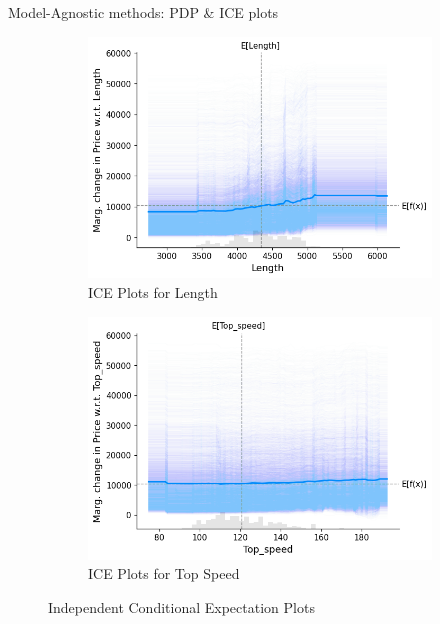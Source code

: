 \documentclass{beamer}
\begin{document}
\begin{frame}{Model-Agnostic methods: PDP \& ICE plots}
\begin{figure}[h]
    \begin{subfigure}{0.38\textwidth}
      \includegraphics[width=\linewidth]{ice_length.png}
      \caption{ICE Plots for Length}
      \label{ice_length}
    \end{subfigure}
    \hfill
    \begin{subfigure}{0.38\textwidth}
      \includegraphics[width=\linewidth]{ice_topspeed.png}
      \caption{ICE Plots for Top Speed}
      \label{ice_topspeed}
    \end{subfigure}
    
    \caption{Independent Conditional Expectation Plots}
    \label{ice_plots}
  \end{figure}
\end{frame}
\end{document}
